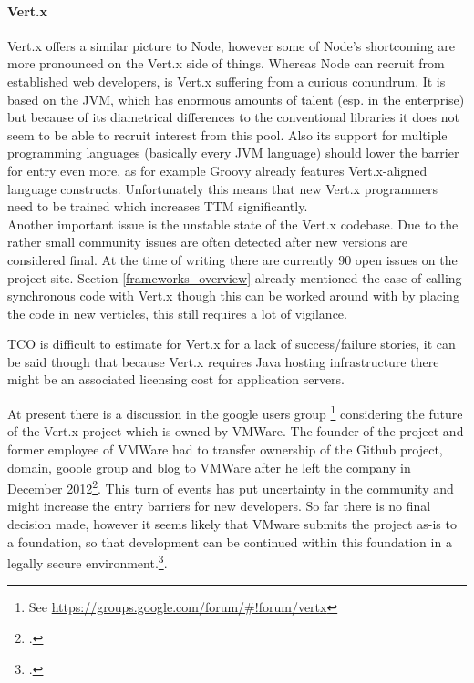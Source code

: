 \paragraph{Vert.x}
Vert.x offers a similar picture to Node, however some of Node's shortcoming are
more pronounced on the Vert.x side of things. Whereas Node can recruit from
established web developers, is Vert.x suffering from a curious conundrum. It is
based on the JVM, which has enormous amounts of talent (esp. in the enterprise)
but because of its diametrical differences to the conventional libraries it does
not seem to be able to recruit interest from this pool. Also its support for
multiple programming languages (basically every JVM language) should lower the
barrier for entry even more, as for example Groovy already features
Vert.x-aligned language constructs. Unfortunately this means that new Vert.x
programmers need to be trained which increases TTM significantly.\\
Another important issue is the unstable state of the Vert.x codebase. Due to the
rather small community issues are often detected after new versions are considered final.
At the time of writing there are currently 90 open issues on the project site.
Section \ref{frameworks_overview} already mentioned the ease of calling synchronous code with Vert.x though this
can be worked around with by placing the code in new verticles, this still
requires a lot of vigilance.

TCO is difficult to estimate for Vert.x for a lack of success/failure stories,
it can be said though that because Vert.x requires Java hosting infrastructure
there might be an associated licensing cost for application servers.

At present there is a discussion in the google users group
\footnote{See \url{https://groups.google.com/forum/\#!forum/vertx}} considering the future of
the Vert.x project which is owned by VMWare. The founder of the project and
former employee of VMWare had to transfer ownership of the Github project,
domain, gooole group and blog to VMWare after he left the company in December
2012\footcite[Cf.][]{Vertx_announcement_2013}. This turn of events has put
uncertainty in the community and might increase the entry barriers for new
developers. So far there is no final decision made, however it seems likely that VMware
submits the project as-is to a foundation, so that development can be continued
within this foundation in a legally secure environment.\footcite[Cf.][]{Vertx_future_2013}.


